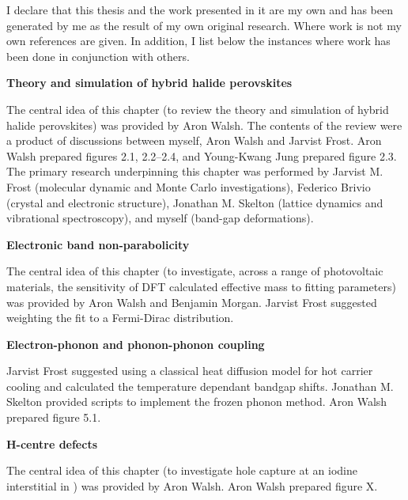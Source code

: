 I declare that this thesis and the work presented in it are my own and has been generated by me as the result of my own original research. Where work is not my own references are given. In addition, I list below the instances where work has been done in conjunction with others.
\vspace{\frontmatterbaselineskip}

\textbf{Theory and simulation of hybrid halide perovskites } 

The central idea of this chapter (to review the theory and simulation of hybrid halide perovskites) was provided by Aron Walsh. The contents of the review were a product of discussions between myself, Aron Walsh and Jarvist Frost. Aron Walsh prepared figures 2.1, 2.2--2.4, and Young-Kwang Jung prepared figure 2.3. The primary research underpinning this chapter was performed by Jarvist M. Frost (molecular dynamic and Monte Carlo investigations), Federico Brivio (crystal and electronic structure), Jonathan M. Skelton (lattice dynamics and vibrational spectroscopy), and myself (band-gap deformations).

\vspace{\frontmatterbaselineskip}

\textbf{Electronic band non-parabolicity}

The central idea of this chapter (to investigate, across a range of photovoltaic materials, the sensitivity of DFT calculated effective mass to fitting parameters) was provided by Aron Walsh and Benjamin Morgan. Jarvist Frost suggested weighting the fit to a Fermi-Dirac distribution. 

\vspace{\frontmatterbaselineskip}

\textbf{Electron-phonon and phonon-phonon coupling}

Jarvist Frost suggested using a classical heat diffusion model for hot carrier cooling and calculated the temperature dependant bandgap shifts. Jonathan M. Skelton provided scripts to implement the frozen phonon method. Aron Walsh prepared figure 5.1.

\vspace{\frontmatterbaselineskip}

\textbf{H-centre defects}

The central idea of this chapter (to investigate hole capture at an iodine interstitial in ) was provided by Aron Walsh. Aron Walsh prepared figure X.